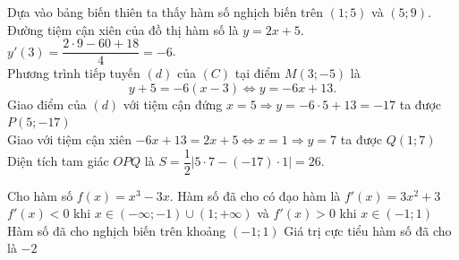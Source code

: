 \begin{ex}
{\begin{itemchoice}
			\itemch Dựa vào bảng biến thiên ta thấy hàm số nghịch biến trên $(1; 5)$ và $(5; 9)$.
			\itemch Đường tiệm cận xiên của đồ thị hàm số là $y = 2x + 5$.
			\itemch 
			$y'(3) = \dfrac{2\cdot 9 - 60 + 18}{4} = -6$. \\
			Phương trình tiếp tuyến $(d)$ của $(C)$ tại điểm $M(3; -5)$ là $$y + 5 = -6(x - 3)\Leftrightarrow y = -6x + 13.$$
			Giao điểm của $(d)$ với tiệm cận đứng $x = 5 \Rightarrow y = -6 \cdot 5 + 13 = -17$ ta được $P(5;-17)$ \\
			Giao với tiệm cận xiên $-6x + 13 = 2x + 5 \Leftrightarrow x = 1 \Rightarrow y = 7$ ta được $Q(1; 7)$ \\
			Diện tích tam giác $OPQ$ là $S = \dfrac{1}{2} \left| 5 \cdot 7 - (-17) \cdot 1\right|= 26$.
		\end{itemchoice}
	}
\end{ex}

\begin{ex}%
	Cho hàm số $f(x) = x^3 - 3x$.
	\choiceTF
	{Hàm số đã cho có đạo hàm là $f'(x) = 3x^2 + 3$}
	{$f'(x) < 0$ khi $x \in (-\infty; -1) \cup (1; +\infty)$ và $f'(x) > 0$ khi $x \in (-1; 1)$}
	{\True Hàm số đã cho nghịch biến trên khoảng $(-1; 1)$}
	{\True Giá trị cực tiểu hàm số đã cho là $-2$}
\end{ex}

